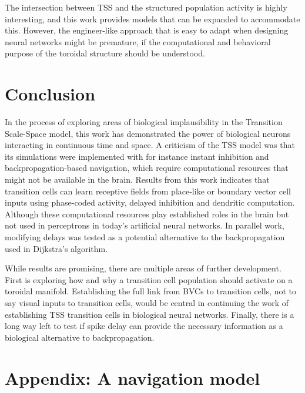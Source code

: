 \documentclass{article}
\begin{document}
    The intersection between TSS and the structured population activity is highly interesting, and this work provides models that can be expanded to accommodate this. However, the engineer-like approach that is easy to adapt when designing neural networks might be premature, if the computational and behavioral purpose of the toroidal structure should be understood. 

    
    \newpage
    \section{Conclusion}
    In the process of exploring areas of biological implausibility in the Transition Scale-Space model, this work has demonstrated the power of biological neurons interacting in continuous time and space. A criticism of the TSS model was that its simulations were implemented with for instance instant inhibition and backpropagation-based navigation, which require computational resources that might not be available in the brain. Results from this work indicates that transition cells can learn receptive fields from place-like or boundary vector cell inputs using phase-coded activity, delayed inhibition and dendritic computation. Although these computational resources play established roles in the brain but not used in perceptrons in today's artificial neural networks. In parallel work, modifying delays was tested as a potential alternative to the backpropagation used in Dijkstra's algorithm. 
    
    While results are promising, there are multiple areas of further development. First is exploring how and why a transition cell population should activate on a toroidal manifold. Establishing the full link from BVCs to transition cells, not to say visual inputs to transition cells, would be central in continuing the work of establishing TSS transition cells in biological neural networks. Finally, there is a long way left to test if spike delay can provide the necessary information as a biological alternative to backpropagation.

    \printbibliography{}

    \newpage
    \appendix
    \section{Appendix: A navigation model} \label{Appendix}
\end{document}
